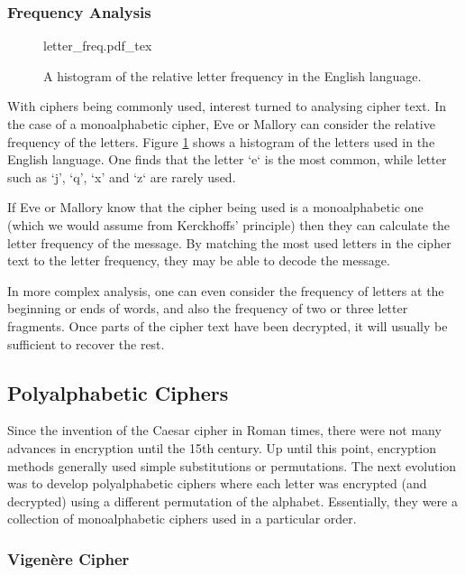 \subsubsection*{Frequency Analysis}

\begin{figure}[t]
	\centering
	\def\svgwidth{0.5\textwidth}
   	{letter_freq.pdf_tex}
   	\caption[Relative letter frequency in the English language]{A histogram of the relative letter frequency in the English language.}
   	\label{fig:letter_freq}
\end{figure}

With ciphers being commonly used, interest turned to analysing cipher text. In the case of a monoalphabetic cipher, Eve or Mallory can consider the relative frequency of the letters. Figure \ref{fig:letter_freq} shows a histogram of the letters used in the English language. One finds that the letter `e`  is the most common, while letter such as `j', `q', `x' and `z` are rarely used.

If Eve or Mallory know that the cipher being used is a monoalphabetic one (which we would assume from Kerckhoffs' principle) then they can calculate the letter frequency of the message. By matching the most used letters in the cipher text to the letter frequency, they may be able to decode the message. 

In more complex analysis, one can even consider the frequency of letters at the beginning or ends of words, and also the frequency of two or three letter fragments. Once parts of the cipher text have been decrypted, it will usually be sufficient to recover the rest.

\subsection{Polyalphabetic Ciphers}

Since the invention of the Caesar cipher in Roman times, there were not many advances in encryption until the 15th century. Up until this point, encryption methods generally used simple substitutions or permutations. The next evolution was to develop polyalphabetic ciphers where each letter was encrypted (and decrypted) using a different permutation of the alphabet. Essentially, they were a collection of monoalphabetic ciphers used in a particular order.

\subsubsection*{Vigen\`{e}re Cipher}

